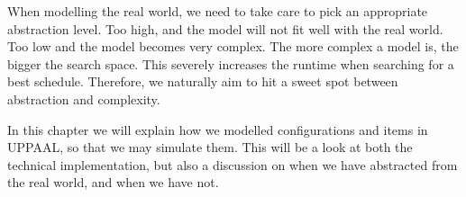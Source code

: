 When modelling the real world, we need to take care to pick an appropriate abstraction level. Too high, and the model will not fit well with the real world. Too low and the model becomes very complex. The more complex a model is, the bigger the search space. This severely increases the runtime when searching for a best schedule. Therefore, we naturally aim to hit a sweet spot between abstraction and complexity.

In this chapter we will explain how we modelled configurations and items in UPPAAL, so that we may simulate them. This will be a look at both the technical implementation, but also a discussion on when we have abstracted from the real world, and when we have not.  




